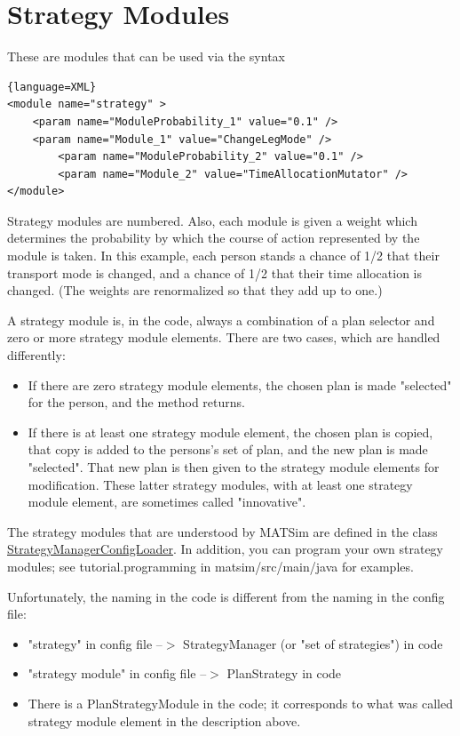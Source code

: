 \chapter{Strategy Modules}


These are modules that can be used via the syntax
\begin{lstlisting}{language=XML}
<module name="strategy" >
	<param name="ModuleProbability_1" value="0.1" />
	<param name="Module_1" value="ChangeLegMode" />
        <param name="ModuleProbability_2" value="0.1" />
        <param name="Module_2" value="TimeAllocationMutator" />
</module>
\end{lstlisting}


Strategy modules are numbered. Also, each  module is given a weight which determines the probability by which the  course of action represented by the module is taken. In this example,  each person stands a chance of 1/2 that their transport mode is changed,  and a chance of 1/2 that their time allocation is changed. (The  weights are renormalized so that they add up to one.)

A strategy module is, in the code, always a combination of a plan  selector and zero or more strategy module elements. There are two cases,  which are handled differently:
\begin{itemize}
	\item If there are zero strategy module elements, the chosen plan is made "selected" for the person, and the method returns.
	\item If there is at least one strategy module element, the chosen plan is  copied, that copy is added to the persons's set of plan, and the new  plan is made "selected". That new plan is then given to the  strategy module elements for modification. These latter strategy  modules, with at least one strategy module element, are sometimes called  "innovative".
\end{itemize}

The strategy modules that are understood by MATSim are defined in the class \href{http://www.matsim.org/xref/org/matsim/core/replanning/StrategyManagerConfigLoader.html}{StrategyManagerConfigLoader}. In addition, you can program your own strategy modules; see tutorial.programming in matsim/src/main/java for examples.

Unfortunately, the naming in the code is different from the naming in the config file:
\begin{itemize}
	\item "strategy" in config file --$>$ StrategyManager (or "set of strategies") in code
	\item "strategy module" in config file --$>$ PlanStrategy in code
	\item There is a PlanStrategyModule in the code; it corresponds to what was called strategy module element in the description above.
\end{itemize}

